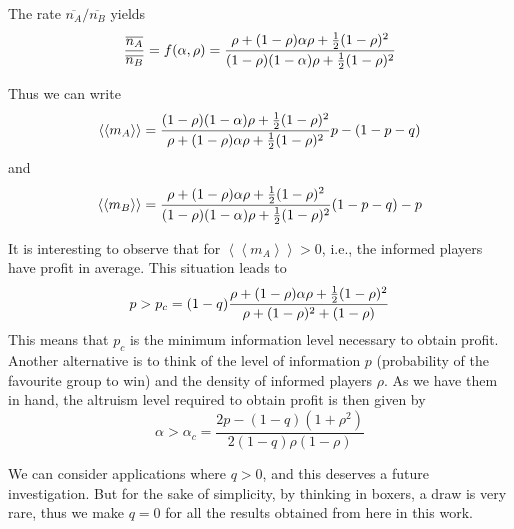 \documentclass[3p, 11pt]{elsarticle}
\begin{document}
The rate $\overline{n_{A}}/\overline{n_{B}}$ yields 
\begin{equation*}
\frac{\overline{n_{A}}}{\overline{n_{B}}}=f(\alpha ,\rho )=\frac{%
\rho+(1-\rho )\alpha \rho +\frac{1}{2}(1-\rho )^{2}}{(1-\rho )(1-\alpha
)\rho +\frac{1}{2}(1-\rho )^{2}}
\end{equation*}

Thus we can write 
\begin{equation}
\left\langle \left\langle m_{A}\right\rangle \right\rangle=\frac{%
(1-\rho)(1-\alpha )\rho +\frac{1}{2}(1-\rho )^{2}}{\rho +(1-\rho )\alpha
\rho +\frac{1}{2}(1-\rho )^{2}}p-(1-p-q)  \label{Eq:payoffa}
\end{equation}
and 
\begin{equation}
\left\langle \left\langle m_{B}\right\rangle \right\rangle =\frac{%
\rho+(1-\rho )\alpha \rho +\frac{1}{2}(1-\rho )^{2}}{(1-\rho )(1-\alpha
)\rho +\frac{1}{2}(1-\rho )^{2}}(1-p-q)-p  \label{Eq:payoffb}
\end{equation}

It is interesting to observe that for $\left\langle \left\langle
m_{A}\right\rangle \right\rangle >0$, i.e., the informed players have profit
in average. This situation leads to 
\begin{equation}
p>p_{c}=(1-q)\frac{\rho +(1-\rho )\alpha \rho +\frac{1}{2}(1-\rho )^{2}}{%
\rho +(1-\rho )^{2}+(1-\rho )}  \label{Eq:critical_information}
\end{equation}%
This means that $p_{c}$ is the minimum information level necessary to obtain
profit. Another alternative is to think of the level of information $p$
(probability of the favourite group to win) and the density of informed
players $\rho $. As we have them in hand, the altruism level required to
obtain profit is then given by 
\begin{equation}
\alpha >\alpha _{c}=\frac{2p-(1-q)(1+\rho ^{2})}{2(1-q)\rho (1-\rho )}
\label{Eq:critical_altruism}
\end{equation}

We can consider applications where $q>0$, and this deserves a future
investigation. But for the sake of simplicity, by thinking in boxers, a draw
is very rare, thus we make $q=0$ for all the results obtained from here in
this work.  
\end{document}
